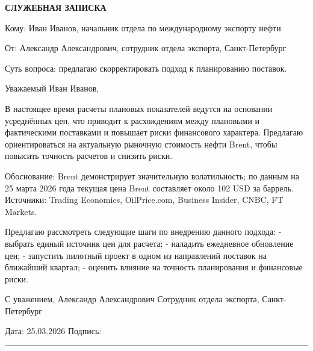 \documentclass[12pt]{article}
\begin{document}
\begin{center}
\textbf{\LARGE СЛУЖЕБНАЯ ЗАПИСКА}
\end{center}

\vspace{1cm}

Кому: Иван Иванов, начальник отдела по международному экспорту нефти

От: Александр Александрович, сотрудник отдела экспорта, Санкт-Петербург

Суть вопроса: предлагаю скорректировать подход к планированию поставок.

Уважаемый Иван Иванов,

В настоящее время расчеты плановых показателей ведутся на основании усреднённых цен, что приводит к расхождениям между плановыми и фактическими поставками и повышает риски финансового характера. Предлагаю ориентироваться на актуальную рыночную стоимость нефти Brent, чтобы повысить точность расчетов и снизить риски.

Обоснование: Brent демонстрирует значительную волатильность; по данным на 25 марта 2026 года текущая цена Brent составляет около 102 USD за баррель. Источники: Trading Economics, OilPrice.com, Business Insider, CNBC, FT Markets.

Предлагаю рассмотреть следующие шаги по внедрению данного подхода:
- выбрать единый источник цен для расчета;
- наладить ежедневное обновление цен;
- запустить пилотный проект в одном из направлений поставок на ближайший квартал;
- оценить влияние на точность планирования и финансовые риски.

С уважением,
Александр Александрович
Сотрудник отдела экспорта, Санкт-Петербург

\vfill

\noindent
Дата: 25.03.2026 \hfill Подпись: \rule{5cm}{0.4pt}
\end{document}

